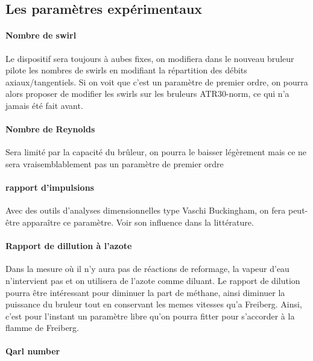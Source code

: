 \subsection{Les paramètres expérimentaux}
\paragraph{Nombre de swirl}
Le dispositif sera toujours à aubes fixes, on modifiera dans le nouveau bruleur pilote les nombres de swirls en modifiant la répartition des débits axiaux/tangentiels.
Si on voit que c'est un paramètre de premier ordre, on pourra alors proposer de modifier les swirls sur les bruleurs ATR30-norm, ce qui n'a jamais été fait avant.
\paragraph{Nombre de Reynolds}
Sera limité par la capacité du brûleur, on pourra le baisser légèrement mais ce ne sera vraisemblablement pas un paramètre de premier ordre
\paragraph{rapport d'impulsions}
Avec des outils d'analyses dimensionnelles type Vaschi Buckingham, on fera peut-être apparaître ce paramètre. Voir son influence dans la littérature.
\paragraph{Rapport de dillution à l'azote}
Dans la mesure où il n'y aura pas de réactions de reformage, la vapeur d'eau n'intervient pas et on utilisera de l'azote comme diluant. Le rapport de dilution pourra être intéressant pour diminuer la part de méthane, ainsi diminuer la puissance du bruleur tout en conservant les memes vitesses qu'a Freiberg. Ainsi, c'est pour l'instant un paramètre libre qu'on pourra fitter pour s'accorder à la flamme de Freiberg.
\paragraph{Qarl number}

\clearpage


\clearpage{\pagestyle{empty}\cleardoublepage}
